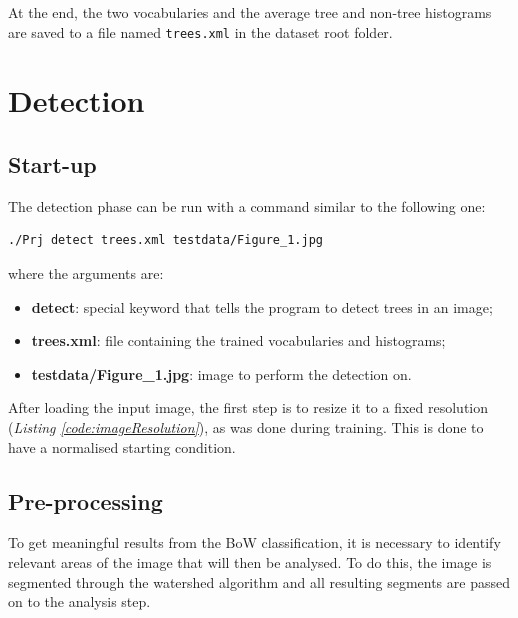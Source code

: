 \documentclass{article}
\begin{document}


At the end, the two vocabularies and the average tree and non-tree histograms are saved to a file named \texttt{trees.xml} in the dataset root folder.

\section{Detection}
\subsection{Start-up}
The detection phase can be run with a command similar to the following one:

\begin{lstlisting}[style=CommandLine]
./Prj detect trees.xml testdata/Figure_1.jpg
\end{lstlisting}

where the arguments are:
\begin{itemize}
\item \textbf{detect}: special keyword that tells the program to detect trees in an image;
\item \textbf{trees.xml}: file containing the trained vocabularies and histograms;
\item \textbf{testdata/Figure\_1.jpg}: image to perform the detection on.
\end{itemize}

After loading the input image, the first step is to resize it to a fixed resolution (\textit{Listing \ref{code:imageResolution}}), as was done during training. This is done to have a normalised starting condition.



\subsection{Pre-processing}
To get meaningful results from the BoW classification, it is necessary to identify relevant areas of the image that will then be analysed. To do this, the image is segmented through the watershed algorithm and all resulting segments are passed on to the analysis step.
\end{document}
